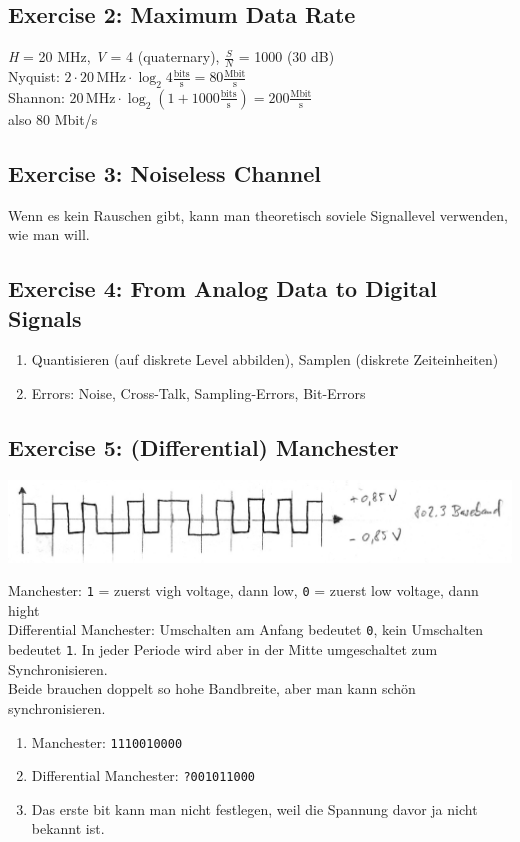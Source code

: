 \documentclass[10pt,a4paper]{scrartcl}
\begin{document}
\subsection*{Exercise 2: Maximum Data Rate}
\textit{H} = 20 MHz, \textit{V} = 4 (quaternary), $\frac{S}{N}$ = 1000 (30 dB)\\

Nyquist: $ 2 \cdot 20\, \mathrm{MHz} \cdot \log_2{4} \frac{\mathrm{bits}}{\mathrm{s}} = 80 \frac{\mathrm{Mbit}}{\mathrm{s}}$ \\

Shannon: $ 20\, \mathrm{MHz} \cdot \log_2{(1+1000\frac{\mathrm{bits}}{\mathrm{s}})} = 200 \frac{\mathrm{Mbit}}{\mathrm{s}}$\\

also 80 Mbit/s

\subsection*{Exercise 3: Noiseless Channel}
Wenn es kein Rauschen gibt, kann man theoretisch soviele Signallevel verwenden, wie man will.

\subsection*{Exercise 4: From Analog Data to Digital Signals}
\begin{enumerate}
\item Quantisieren (auf diskrete Level abbilden), Samplen (diskrete Zeiteinheiten)
\item Errors: Noise, Cross-Talk, Sampling-Errors, Bit-Errors
\end{enumerate}

\subsection*{Exercise 5: (Differential) Manchester}
\includegraphics[width=\textwidth]{a3e5.jpg}

Manchester: \texttt{1} = zuerst vigh voltage, dann low, \texttt{0} = zuerst low voltage, dann hight\\
Differential Manchester: Umschalten am Anfang bedeutet \texttt{0}, kein Umschalten bedeutet \texttt{1}. In jeder Periode wird aber in der Mitte umgeschaltet zum Synchronisieren.\\
Beide brauchen doppelt so hohe Bandbreite, aber man kann schön synchronisieren.
\begin{enumerate}
\item Manchester: \texttt{1110010000}
\item Differential Manchester: \texttt{?001011000}
\item Das erste bit kann man nicht festlegen, weil die Spannung davor ja nicht bekannt ist.
\end{enumerate} 
\end{document}
